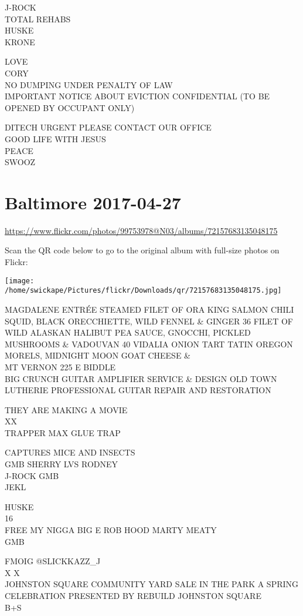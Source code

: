 \documentclass[10pt,letterpaper]{article}
\begin{document}
J{-}ROCK\\
TOTAL REHABS\\
HUSKE\\
KRONE

LOVE\\
CORY\\
NO DUMPING UNDER PENALTY OF LAW\\
IMPORTANT NOTICE ABOUT EVICTION CONFIDENTIAL (TO BE OPENED BY OCCUPANT ONLY)

DITECH URGENT PLEASE CONTACT OUR OFFICE\\
GOOD LIFE WITH JESUS\\
PEACE\\
SWOOZ


\section*{Baltimore 2017-04-27}

\url{https://www.flickr.com/photos/99753978@N03/albums/72157683135048175}

Scan the QR code below to go to the original album with full-size photos on Flickr:

\texttt{[image: /home/swickape/Pictures/flickr/Downloads/qr/72157683135048175.jpg]}


MAGDALENE ENTRÉE STEAMED FILET OF ORA KING SALMON CHILI SQUID, BLACK ORECCHIETTE, WILD FENNEL \& GINGER 36 FILET OF WILD ALASKAN HALIBUT PEA SAUCE, GNOCCHI, PICKLED MUSHROOMS \& VADOUVAN 40 VIDALIA ONION TART TATIN OREGON MORELS, MIDNIGHT MOON GOAT CHEESE \&\\
MT VERNON 225 E BIDDLE\\
BIG CRUNCH GUITAR AMPLIFIER SERVICE \& DESIGN OLD TOWN LUTHERIE PROFESSIONAL GUITAR REPAIR AND RESTORATION

THEY ARE MAKING A MOVIE\\
XX\\
TRAPPER MAX GLUE TRAP

CAPTURES MICE AND INSECTS\\
GMB SHERRY LVS RODNEY\\
J{-}ROCK GMB\\
JEKL

HUSKE\\
16\\
FREE MY NIGGA BIG E ROB HOOD MARTY MEATY\\
GMB

FMOIG @SLICKKAZZ\_J\\
X X\\
JOHNSTON SQUARE COMMUNITY YARD SALE IN THE PARK A SPRING CELEBRATION PRESENTED BY REBUILD JOHNSTON SQUARE\\
B+S
\end{document}
